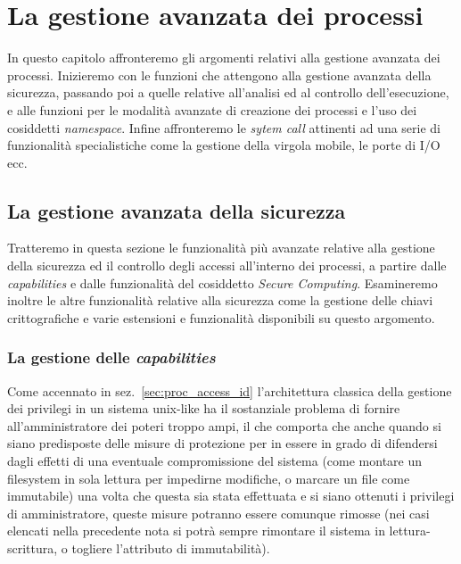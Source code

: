 \chapter{La gestione avanzata dei processi}
\label{cha:proc_advanced}

In questo capitolo affronteremo gli argomenti relativi alla gestione avanzata
dei processi. Inizieremo con le funzioni che attengono alla gestione avanzata
della sicurezza, passando poi a quelle relative all'analisi ed al controllo
dell'esecuzione, e alle funzioni per le modalità avanzate di creazione dei
processi e l'uso dei cosiddetti \textit{namespace}. Infine affronteremo le
\textit{sytem call} attinenti ad una serie di funzionalità specialistiche come
la gestione della virgola mobile, le porte di I/O ecc.

\section{La gestione avanzata della sicurezza}
\label{sec:process_security}

Tratteremo in questa sezione le funzionalità più avanzate relative alla
gestione della sicurezza ed il controllo degli accessi all'interno dei
processi, a partire dalle \textit{capabilities} e dalle funzionalità del
cosiddetto \textit{Secure Computing}. Esamineremo inoltre le altre
funzionalità relative alla sicurezza come la gestione delle chiavi
crittografiche e varie estensioni e funzionalità disponibili su questo
argomento.


\subsection{La gestione delle \textit{capabilities}}
\label{sec:proc_capabilities}


Come accennato in sez.~\ref{sec:proc_access_id} l'architettura classica della
gestione dei privilegi in un sistema unix-like ha il sostanziale problema di
fornire all'amministratore dei poteri troppo ampi, il che comporta che anche
quando si siano predisposte delle misure di protezione per in essere in grado
di difendersi dagli effetti di una eventuale compromissione del sistema (come
montare un filesystem in sola lettura per impedirne modifiche, o marcare un
file come immutabile) una volta che questa sia stata effettuata e si siano
ottenuti i privilegi di amministratore, queste misure potranno essere comunque
rimosse (nei casi elencati nella precedente nota si potrà sempre rimontare il
sistema in lettura-scrittura, o togliere l'attributo di immutabilità).


